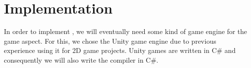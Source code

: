 \chapter{Implementation} \label{chap:implementation}
In order to implement \dazel{}, we will eventually need some kind of game engine for the game aspect.
For this, we chose the Unity game engine\cite{technologies_unity_nodate} due to previous experience using it for 2D game projects.
Unity games are written in C\# and consequently we will also write the \dazel{} compiler in C\#. 